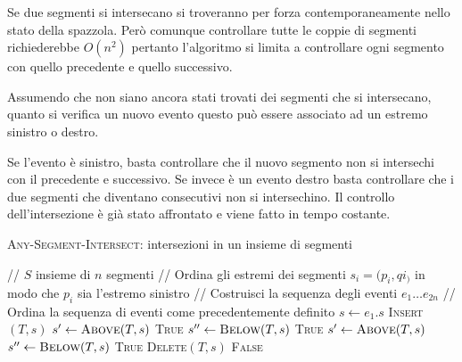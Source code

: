 Se due segmenti si intersecano si troveranno per forza contemporaneamente nello stato della spazzola. 
Però comunque controllare tutte le coppie di segmenti richiederebbe $O(n^{2})$ pertanto l'algoritmo si limita a controllare ogni segmento con quello precedente e quello successivo.

Assumendo che non siano ancora stati trovati dei segmenti che si intersecano, quanto si verifica un nuovo evento questo può essere associato ad un estremo sinistro o destro.

Se l'evento è sinistro, basta controllare che il nuovo segmento non si intersechi con il precedente e successivo. 
Se invece è un evento destro basta controllare che i due segmenti che diventano consecutivi non si intersechino. 
Il controllo dell'intersezione è già stato affrontato e viene fatto in tempo costante.

\begin{breakablealgorithm}
	\caption{\textsc{Any-Segment-Intersect}: intersezioni in un insieme di segmenti}
	\begin{algorithmic}[1]
		    \State // $S$ insieme di $n$ segmenti
		    \State // Ordina gli estremi dei segmenti $s_i = (p_i,qi_)$ in modo che $p_i$ sia l'estremo sinistro
		    \State // Costruisci la sequenza degli eventi $e_1 \ldots e_{2n}$
		    \State // Ordina la sequenza di eventi come precedentemente definito
		        \State $s \gets e_1.s$
		            \State \textsc{Insert}$(T,s)$
		            \State $s' \gets \textsc{Above}(T,s)$
		                \State \Return \textsc{True}
		            \EndIf
		            \State $s'' \gets \textsc{Below}(T,s)$
		                \State \Return \textsc{True}
		            \EndIf
		        \Else {}
		            \State $s' \gets \textsc{Above}(T,s)$ 
		            \State $s'' \gets \textsc{Below}(T,s)$
		                \State \Return \textsc{True}
		            \EndIf
		            \State \textsc{Delete}$(T,s)$
		        \EndIf
		    \EndFor
		\State \Return \textsc{False}
		\EndFunction

\end{algorithmic}
\end{breakablealgorithm}

